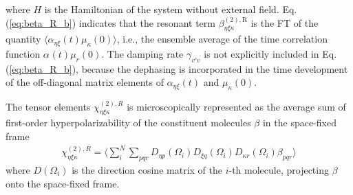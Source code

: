 where $H$ is the Hamiltonian of the system without external field. 
Eq.\thinspace(\ref{eq:beta_R_b}) indicates that the resonant term $\beta_{\eta\xi\kappa}^{(2),\text{R}}$ is the FT 
of the quantity $\langle\alpha_{\eta\xi}(t)\mu_{\kappa}(0)\rangle$, i.e., the ensemble average of the time correlation function $\alpha_{}(t)\mu_{r}(0)$.
The damping rate $\gamma_{v'v}$ is not explicitly included in Eq.\thinspace(\ref{eq:beta_R_b}), because the dephasing is incorporated in the time development of the off-diagonal matrix elements 
of $\alpha_{\eta\xi}(t)$ and $\mu_{\kappa}(0)$.

The tensor elements $\chi^{(2),R}_{\eta\xi\kappa}$ is microscopically represented as the average sum of first-order hyperpolarizability of the constituent molecules $\beta$ in the space-fixed frame
\begin{align}
  \chi^{(2),R}_{\eta\xi\kappa} = \langle \sum_i^N \sum_{pqr} D_{\eta p}(\Omega_i) D_{\xi q}(\Omega_i) D_{\kappa r}(\Omega_i) \beta_{pqr}\rangle
\label{average_sum}
\end{align}
where $D(\Omega_i)$ is the direction cosine matrix of the $i$-th molecule, projecting $\beta$ onto the space-fixed frame\cite{Morita2000}.

